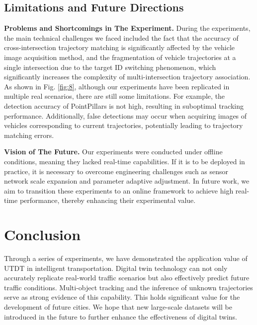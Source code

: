 \documentclass[journal,twoside,web]{ieeecolor}
\begin{document}
\subsection{Limitations and Future Directions}

\textbf{Problems and Shortcomings in The Experiment.}
During the experiments, the main technical challenges we faced included the fact that the accuracy of cross-intersection trajectory matching is significantly affected by the vehicle image acquisition method, and the fragmentation of vehicle trajectories at a single intersection due to the target ID switching phenomenon, which significantly increases the complexity of multi-intersection trajectory association.
As shown in Fig. \ref{fig:8}, although our experiments have been replicated in multiple real scenarios, there are still some limitations.
For example, the detection accuracy of PointPillars is not high, resulting in suboptimal tracking performance. 
Additionally, false detections may occur when acquiring images of vehicles corresponding to current trajectories, potentially leading to trajectory matching errors.

\textbf{Vision of The Future.}
Our experiments were conducted under offline conditions, meaning they lacked real-time capabilities. 
If it is to be deployed in practice, it is necessary to overcome engineering challenges such as sensor network scale expansion and parameter adaptive adjustment.
In future work, we aim to transition these experiments to an online framework to achieve high real-time performance, thereby enhancing their experimental value.


\section{Conclusion}

Through a series of experiments, we have demonstrated the application value of UTDT in intelligent transportation. 
Digital twin technology can not only accurately replicate real-world traffic scenarios but also effectively predict future traffic conditions. 
Multi-object tracking and the inference of unknown trajectories serve as strong evidence of this capability. 
This holds significant value for the development of future cities.
We hope that new large-scale datasets will be introduced in the future to further enhance the effectiveness of digital twins.

\end{document}
